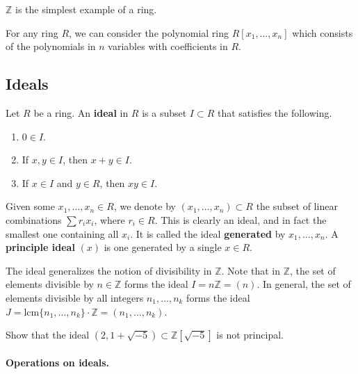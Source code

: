 \begin{example} 
$\mathbb{Z}$ is the simplest example of a ring.
\end{example} 

\begin{example}
For any ring $R$, we can consider the polynomial ring $R[x_1, \ldots, x_n]$
which consists of the polynomials in $n$ variables with coefficients in $R$.
\end{example}

\subsection{Ideals}

\begin{definition}
Let $R$ be a ring.  An \textbf{ideal} in $R$ is a subset $I \subset R$ that
satisfies the following.

\begin{enumerate}
  \item $0 \in I$.
  \item If $x, y \in I$, then $x + y \in I$.
  \item If $x \in I$ and $y \in R$, then $xy \in I$.
\end{enumerate}
\end{definition}

Given some $x_1, \ldots, x_n \in R$, we denote by $(x_1, \ldots, x_n) \subset
R$ the subset of linear combinations $\sum r_i x_i$, where $r_i \in R$.  This
is clearly an ideal, and in fact the smallest one containing all $x_i$.  It is
called the ideal \textbf{generated} by $x_1, \ldots, x_n$.  A
\textbf{principle ideal} $(x)$ is one generated by a single $x \in R$.

\begin{example}
The ideal generalizes the notion of divisibility in $\mathbb{Z}$.  Note that
in $\mathbb{Z}$, the set of elements divisible by $n \in \mathbb{Z}$
forms the ideal $I = n\mathbb{Z} = (n)$.  In general, the set of elements
divisible by all integers $n_1, \ldots, n_k$ forms the ideal $J =
\mathrm{lcm}\{ n_1, \ldots, n_k \} \cdot \mathbb{Z} = (n_1, \ldots, n_k)$.
\end{example}

\begin{exercise} 
Show that the ideal $(2, 1 + \sqrt{-5}) \subset \mathbb{Z}[\sqrt{-5}]$ is not
principal.
\end{exercise}

\paragraph{Operations on ideals.}

